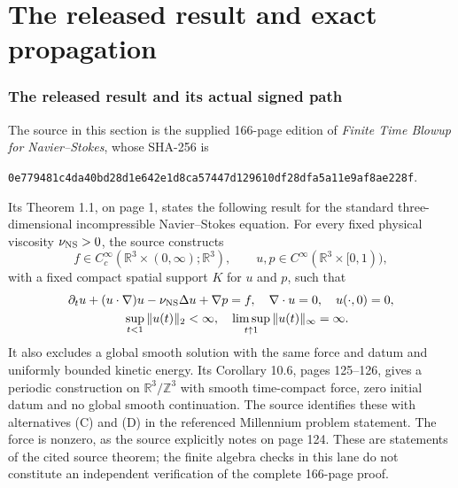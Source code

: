 \documentclass[11pt]{article}
\begin{document}
\clearpage\part{The released result and exact propagation}
\section{The released result and its actual signed path}
\label{nsprop:source}
The source in this section is the supplied 166-page edition of
\emph{Finite Time Blowup for Navier--Stokes}, whose SHA-256 is
\begin{center}\footnotesize
\texttt{0e779481c4da40bd28d1e642e1d8ca57447d129610df28dfa5a11e9af8ae228f}.
\end{center}
Its Theorem 1.1, on page 1, states the following result for the standard
three-dimensional incompressible Navier--Stokes equation. For every
fixed physical viscosity $\nu_{\rm NS}>0$, the source constructs
\[
 f\in C^\infty_c(\mathbb R^3\times(0,\infty);\mathbb R^3),
 \qquad u,p\in C^\infty(\mathbb R^3\times[0,1)),
\]
with a fixed compact spatial support $K$ for $u$ and $p$, such that
\begin{equation}
 \begin{gathered}
 \partial_tu+(u\cdot\nabla)u-\nu_{\rm NS}\Delta u+\nabla p=f,
 \quad \nabla\cdot u=0,\quad u(\cdot,0)=0,\\
 \quad \sup_{t<1}\|u(t)\|_2<\infty,\quad
 \limsup_{t\uparrow1}\|u(t)\|_\infty=\infty .
 \end{gathered}
 \label{nsprop:source_theorem}
\end{equation}
It also excludes a global smooth solution with the same force and datum
and uniformly bounded kinetic energy. Its Corollary 10.6, pages 125--126,
gives a periodic construction on $\mathbb R^3/\mathbb Z^3$ with smooth
time-compact force, zero initial datum and no global smooth continuation.
The source identifies these with alternatives (C) and (D) in the
referenced Millennium problem statement. The force is nonzero, as the
source explicitly notes on page 124. These are statements of the cited
source theorem; the finite algebra checks in this lane do not constitute
an independent verification of the complete 166-page proof.
\end{document}
